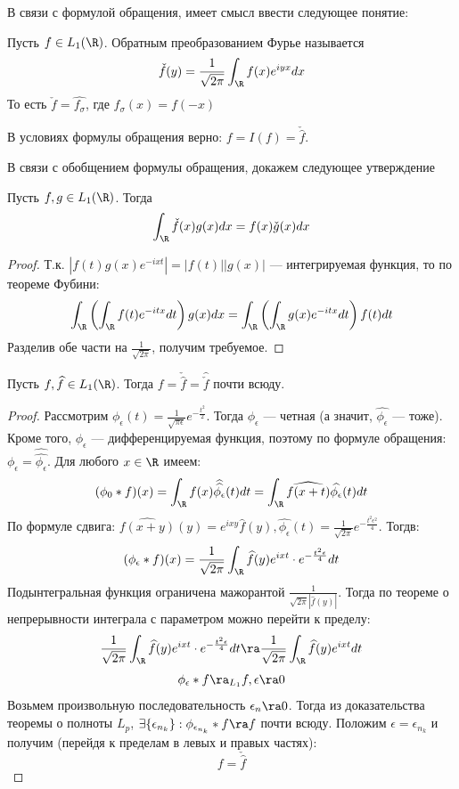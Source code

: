 В связи с формулой обращения, имеет смысл ввести следующее понятие:

\begin{definition}
    Пусть \(f \in L_1(\R)\). Обратным преобразованием Фурье называется 
    \[\check{f}(y) = \frac{1}{\sqrt{2\pi}}\int_\R f(x)e^{iyx}dx\]
    То есть \(\check{f} = \hat{f_\sigma}\), где \(f_\sigma(x) = f(-x)\)
\end{definition}

\begin{note}
    В условиях формулы обращения верно: \(f = I(f) = \check{\hat{f}}\).
\end{note}

В связи с обобщением формулы обращения, докажем следующее утверждение

\begin{lemma}
    Пусть \(f, g \in L_1(\R)\). Тогда 
    \[\int_\R \check{f}(x)g(x)dx = f(x)\check{g}(x)dx\]
\end{lemma}
\begin{proof}
    Т.к. \(|f(t)g(x)e^{-ixt}| = |f(t)||g(x)|\) --- интегрируемая функция, то по теореме Фубини:
    \[\int_\R\left( \int_\R f(t)e^{-itx}dt \right)g(x)dx = \int_\R\left( \int_\R g(x)e^{-itx}dt \right)f(t)dt\]
    Разделив обе части на \(\frac{1}{\sqrt{2\pi}}\), получим требуемое.
\end{proof}

\begin{theorem}
    Пусть \(f, \widehat{f} \in L_1(\R)\). Тогда \(f = \check{\hat{f}} = \hat{\check{f}}\) почти всюду.
\end{theorem}
\begin{proof}
    Рассмотрим \(\phi_\epsilon(t) = \frac{1}{\sqrt{\pi\epsilon}}e^{-\frac{t^2}{2}}\). Тогда \(\phi_\epsilon\) --- четная (а значит, \(\widehat{\phi_\epsilon}\) --- тоже). Кроме того, \(\phi_\epsilon\) --- дифференцируемая функция, поэтому по формуле обращения: \(\phi_\epsilon = \widehat{\widehat{\phi_\epsilon}}\). Для любого \(x \in \R\) имеем:
    \[(\phi_0 * f)(x) = \int_\R f(x)\widehat{\widehat{\phi_\epsilon}}(t)dt = \int_\R \widehat{f(x + t)}\widehat{\phi_\epsilon}(t)dt\]
    По формуле сдвига: \(\widehat{f(x + y)}(y) = e^{ixy}\widehat{f}(y), \widehat{\phi_\epsilon}(t) = \frac{1}{\sqrt{2\pi}}e^{-\frac{t^2\epsilon^2}{4}}\). Тогдв:
    \[(\phi_\epsilon * f)(x) = \frac{1}{\sqrt{2\pi}}\int_\R \widehat{f}(y)e^{ixt}\cdot e^{-\frac{t^2\epsilon}{4}}dt\]
    Подынтегральная функция ограничена мажорантой \(\frac{1}{\sqrt{2\pi}|\widehat{f}(y)|}\). Тогда по теореме о непрерывности интеграла с параметром можно перейти к пределу:
    \[\frac{1}{\sqrt{2\pi}}\int_\R \widehat{f}(y)e^{ixt}\cdot e^{-\frac{t^2\epsilon}{4}}dt \ra \frac{1}{\sqrt{2\pi}}\int_\R \widehat{f}(y)e^{ixt}dt\]
    \[\phi_\epsilon * f \ra_{L_1} f, \epsilon \ra 0\]
    Возьмем произвольную последовательность \(\epsilon_n \ra 0\). Тогда из доказательства теоремы о полноты \(L_p\), \(\exists \{\epsilon_{n_k}\}: \phi_{\epsilon_{n_k}} * f \ra f\) почти всюду. Положим \(\epsilon = \epsilon_{n_k}\) и получим (перейдя к пределам в левых и правых частях):
    \[f = \check{\hat{f}}\]
\end{proof}

